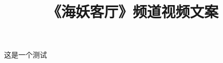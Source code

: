 \documentclass[11pt]{ctexart}
\title{《海妖客厅》频道视频文案}
\begin{document}
    \maketitle

    这是一个测试

    
    
    
\end{document}
